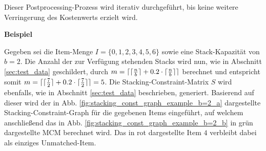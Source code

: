 Dieser Postprocessing-Prozess wird iterativ durchgeführt, bis keine weitere Verringerung des Kostenwerts erzielt wird.

\textbf{Beispiel}

Gegeben sei die Item-Menge $I = \{0, 1, 2, 3, 4, 5, 6\}$ sowie eine Stack-Kapazität von $b = 2$.
Die Anzahl der zur Verfügung stehenden Stacks wird nun, wie in Abschnitt \ref{sec:test_data} geschildert,
durch $m = \lceil\lceil\frac{n}{b}\rceil + 0.2 \cdot \lceil\frac{n}{b}\rceil\rceil$ berechnet und entspricht somit
$m = \lceil\lceil\frac{7}{2}\rceil + 0.2 \cdot \lceil\frac{7}{2}\rceil\rceil = 5$.
Die Stacking-Constraint-Matrix $S$ wird ebenfalls, wie in Abschnitt \ref{sec:test_data} beschrieben, generiert.
Basierend auf dieser wird der in Abb. \ref{fig:stacking_const_graph_example_b=2_a} dargestellte Stacking-Constraint-Graph
für die gegebenen Items eingeführt, auf welchem anschließend das in Abb. \ref{fig:stacking_const_graph_example_b=2_b} in grün dargestellte \textsc{MCM} berechnet wird. Das in rot dargestellte Item $4$ verbleibt dabei als einziges Unmatched-Item.
